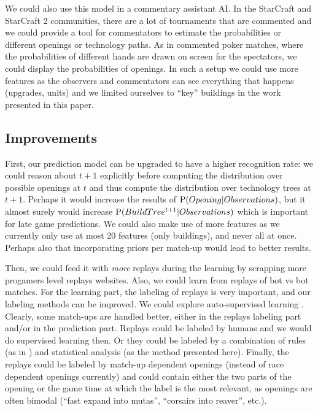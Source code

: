 We could also use this model in a commentary assistant AI. In the StarCraft and StarCraft 2 communities, there are a lot of  tournaments that are commented and we could provide a tool for commentators to estimate the probabilities or different openings or technology paths. As in commented poker matches, where the probabilities of different hands are drawn on screen for the spectators, we could display the probabilities of openings. In such a setup we could use more features as the observers and commentators can see everything that happens (upgrades, units) and we limited ourselves to ``key'' buildings in the work presented in this paper.

\subsection{Improvements}

First, our prediction model can be upgraded to have a higher recognition rate: we could reason about $t+1$ explicitly before computing the distribution over possible openings at $t$ and thus compute the distribution over technology trees at $t+1$. Perhaps it would increase the results of $\mathrm{P}(Opening|Observations)$, but it almost surely would increase $\mathrm{P}(BuildTree^{t+1}|Observations)$ which is important for late game predictions. We could also make use of more features as we currently only use at most 20 features (only buildings), and never all at once. Perhaps also that incorporating priors per match-up would lead to better results.

Then, we could feed it with \textit{more} replays during the learning by scrapping more progamers level replays websites. Also, we could learn from replays of bot vs bot matches. For the learning part, the labeling of replays is very important, and our labeling methods can be improved. 
We could explore auto-supervised learning \citep{AutoSuperLearning}. 
Clearly, some match-ups are handled better, either in the replays labeling part and/or in the prediction part. Replays could be labeled by humans and we would do supervised learning then. Or they could be labeled by a combination of rules (as in \citep{weberStrat}) and statistical analysis (as the method presented here). Finally, the replays could be labeled by match-up dependent openings (instead of race dependent openings currently) and could contain either the two parts of the opening %
or the game time at which the label is the most relevant, as openings are often bimodal (``fast expand into mutas'', ``corsairs into reaver'', etc.).

